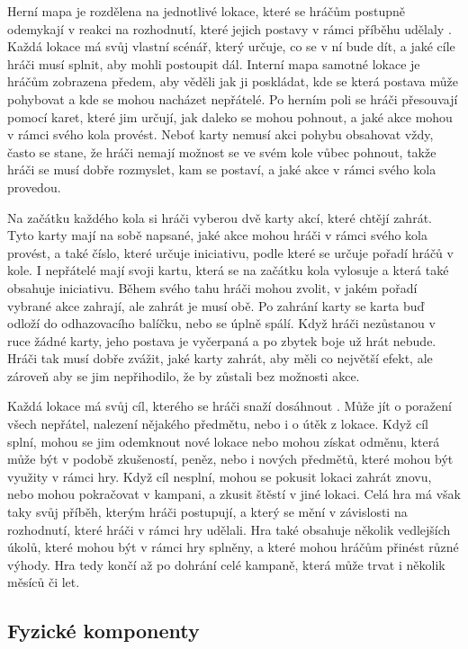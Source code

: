 Herní mapa je rozdělena na jednotlivé lokace, které se hráčům postupně odemykají v reakci na rozhodnutí, které jejich postavy v rámci příběhu udělaly . Každá lokace má svůj vlastní scénář, který určuje, co se v ní bude dít, a jaké cíle hráči musí splnit, aby mohli postoupit dál. Interní mapa samotné lokace je hráčům zobrazena předem, aby věděli jak ji poskládat, kde se která postava může pohybovat a kde se mohou nacházet nepřátelé. Po herním poli se hráči přesouvají pomocí karet, které jim určují, jak daleko se mohou pohnout, a jaké akce mohou v rámci svého kola provést. Neboť karty nemusí akci pohybu obsahovat vždy, často se stane, že hráči nemají možnost se ve svém kole vůbec pohnout, takže hráči se musí dobře rozmyslet, kam se postaví, a jaké akce v rámci svého kola provedou.

Na začátku každého kola si hráči vyberou dvě karty akcí, které chtějí zahrát. Tyto karty mají na sobě napsané, jaké akce mohou hráči v rámci svého kola provést, a také číslo, které určuje iniciativu, podle které se určuje pořadí hráčů v kole. I nepřátelé mají svoji kartu, která se na začátku kola vylosuje a která také obsahuje iniciativu. Během svého tahu hráči mohou zvolit, v jakém pořadí vybrané akce zahrají, ale zahrát je musí obě. Po zahrání karty se karta buď odloží do odhazovacího balíčku, nebo se úplně spálí. Když hráči nezůstanou v ruce žádné karty, jeho postava je vyčerpaná a po zbytek boje už hrát nebude. Hráči tak musí dobře zvážit, jaké karty zahrát, aby měli co největší efekt, ale zároveň aby se jim nepřihodilo, že by zůstali bez možnosti akce.

Každá lokace má svůj cíl, kterého se hráči snaží dosáhnout . Může jít o poražení všech nepřátel, nalezení nějakého předmětu, nebo i o útěk z lokace. Když cíl splní, mohou se jim odemknout nové lokace nebo mohou získat odměnu, která může být v podobě zkušeností, peněz, nebo i nových předmětů, které mohou být využity v rámci hry. Když cíl nesplní, mohou se pokusit lokaci zahrát znovu, nebo mohou pokračovat v kampani, a zkusit štěstí v jiné lokaci. Celá hra má však taky svůj příběh, kterým hráči postupují, a který se mění v závislosti na rozhodnutí, které hráči v rámci hry udělali. Hra také obsahuje několik vedlejších úkolů, které mohou být v rámci hry splněny, a které mohou hráčům přinést různé výhody. Hra tedy končí až po dohrání celé kampaně, která může trvat i několik měsíců či let.

\subsection{Fyzické komponenty}
\label{subsec:gh_components}

